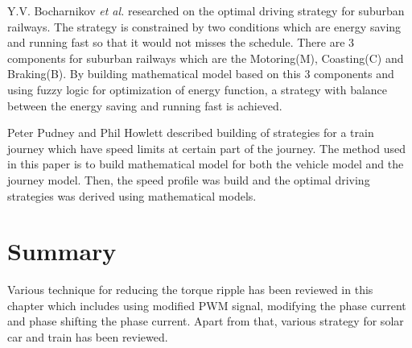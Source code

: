 Y.V. Bocharnikov \textit{et al.} \citep{04295937} researched on the optimal driving strategy for suburban railways. The strategy is constrained by two conditions which are energy saving and running fast so that it would not misses the schedule. There are 3 components for suburban railways which are the Motoring(M), Coasting(C) and Braking(B). By building mathematical model based on this 3 components and using fuzzy logic for optimization of energy function, a strategy with balance between the energy saving and running fast is achieved.

Peter Pudney and Phil Howlett \cite{s03342} described building of strategies for a train journey which have speed limits at certain part of the journey. The method used in this paper is to build mathematical model for both the vehicle model and the journey model. Then, the speed profile was build and the optimal driving strategies was derived using mathematical models.

\section{Summary}

Various technique for reducing the torque ripple has been reviewed in this chapter which includes using modified PWM signal, modifying the phase current and phase shifting the phase current. Apart from that, various strategy for solar car and train has been reviewed.
